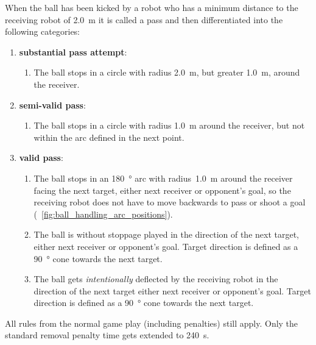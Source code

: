 When the ball has been kicked by a robot who has a minimum distance to the receiving robot of \qty{2.0}{\metre} it is called a pass and then differentiated into the following categories:
\begin{enumerate}
	\item \textbf{substantial pass attempt}:
	\begin{enumerate}
		\item The ball stops in a circle with radius \qty{2.0}{\metre}, but greater \qty{1.0}{\metre}, around the receiver.
	\end{enumerate}
	\item \textbf{semi-valid pass}:
	\begin{enumerate}
		\item The ball stops in a circle with radius \qty{1.0}{\metre} around the receiver, but not within the arc defined in the next point.
	\end{enumerate}
	\item \textbf{valid pass}:
	\begin{enumerate}
		\item The ball stops in an \qty{180}{\degree} arc with radius~\qty{1.0}{\metre} around the receiver facing the next target, either next receiver or opponent's goal, so the receiving robot does not have to move backwards to pass or shoot a goal (\cf~\cref{fig:ball_handling_arc_positions}).
		\item The ball is without stoppage played in the direction of the next target, either next receiver or opponent's goal. Target direction is defined as a \qty{90}{\degree} cone towards the next target.
		\item The ball gets \textit{intentionally} deflected by the receiving robot in the direction of the next target either next receiver or opponent's goal. Target direction is defined as a \qty{90}{\degree} cone towards the next target.
	\end{enumerate}
\end{enumerate}

All rules from the normal game play (including penalties) still apply. Only the standard removal penalty time gets extended to \qty{240}{\second}. 

